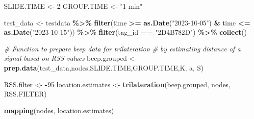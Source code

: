 \documentclass[
]{book}
\newenvironment{Shaded}{\begin{snugshade}}{\end{snugshade}}
\newcommand{\CommentTok}[1]{\textcolor[rgb]{0.56,0.35,0.01}{\textit{#1}}}
\newcommand{\DecValTok}[1]{\textcolor[rgb]{0.00,0.00,0.81}{#1}}
\newcommand{\FunctionTok}[1]{\textcolor[rgb]{0.13,0.29,0.53}{\textbf{#1}}}
\newcommand{\NormalTok}[1]{#1}
\newcommand{\OtherTok}[1]{\textcolor[rgb]{0.56,0.35,0.01}{#1}}
\newcommand{\SpecialCharTok}[1]{\textcolor[rgb]{0.81,0.36,0.00}{\textbf{#1}}}
\newcommand{\StringTok}[1]{\textcolor[rgb]{0.31,0.60,0.02}{#1}}
\begin{document}
\begin{Shaded}
\begin{Highlighting}[]
\NormalTok{SLIDE.TIME }\OtherTok{\textless{}{-}} \DecValTok{2}
\NormalTok{GROUP.TIME }\OtherTok{\textless{}{-}} \StringTok{"1 min"}

\NormalTok{test\_data }\OtherTok{\textless{}{-}}\NormalTok{ testdata }\SpecialCharTok{\%\textgreater{}\%}
  \FunctionTok{filter}\NormalTok{(time }\SpecialCharTok{\textgreater{}=} \FunctionTok{as.Date}\NormalTok{(}\StringTok{"2023{-}10{-}05"}\NormalTok{) }\SpecialCharTok{\&}\NormalTok{ time }\SpecialCharTok{\textless{}=} \FunctionTok{as.Date}\NormalTok{(}\StringTok{"2023{-}10{-}15"}\NormalTok{)) }\SpecialCharTok{\%\textgreater{}\%}
  \FunctionTok{filter}\NormalTok{(tag\_id }\SpecialCharTok{==} \StringTok{"2D4B782D"}\NormalTok{) }\SpecialCharTok{\%\textgreater{}\%}
  \FunctionTok{collect}\NormalTok{()}

\CommentTok{\# Function to prepare beep data for trilateration }
\CommentTok{\# by estimating distance of a signal based on RSS values}
\NormalTok{beep.grouped }\OtherTok{\textless{}{-}} \FunctionTok{prep.data}\NormalTok{(test\_data,nodes,SLIDE.TIME,GROUP.TIME,K, a, S) }

\NormalTok{RSS.filter }\OtherTok{\textless{}{-}} \SpecialCharTok{{-}}\DecValTok{95}
\NormalTok{location.estimates }\OtherTok{\textless{}{-}} \FunctionTok{trilateration}\NormalTok{(beep.grouped, nodes, RSS.FILTER)}

\FunctionTok{mapping}\NormalTok{(nodes, location.estimates)}
\end{Highlighting}
\end{Shaded}


  
\end{document}
